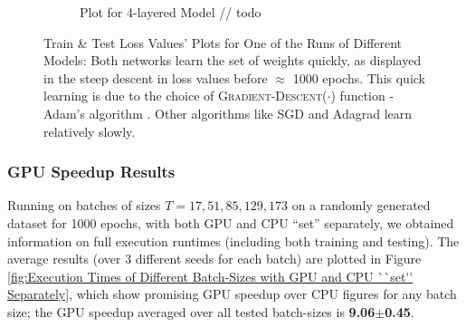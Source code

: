 \documentclass[12pt]{article}
\begin{document}
\begin{figure}[!htbp]
\begin{subfigure}{.49\textwidth}
            \caption{Plot for 4-layered Model // todo}
            \label{fig:Plot for 4-layered Model}
        \end{subfigure}
        \caption[Train \& Test Loss Values' Plots for One of the Runs of Different Models]{Train \& Test Loss Values' Plots for One of the Runs of Different Models: Both networks learn the set of weights quickly, as displayed in the steep descent in loss values before $\approx$ 1000 epochs. This quick learning is due to the choice of \textsc{Gradient-Descent}($\cdot$) function - Adam's algorithm \cite{Adam}. Other algorithms like SGD \cite{SGD} and Adagrad \cite{Adagrad} learn relatively slowly.}
        \label{fig:Train & Test Loss Values' Plots of Different Models}
    \end{figure}

    \subsubsection{GPU Speedup Results} \label{sec:IdProbRes - GPU}
    Running on batches of sizes $T = 17, 51, 85, 129, 173$ on a randomly generated dataset for 1000 epochs, with both GPU and CPU ``set'' separately, we obtained information on full execution runtimes (including both training and testing). The average results (over 3 different seeds for each batch) are plotted in Figure \ref{fig:Execution Times of Different Batch-Sizes with GPU and CPU ``set'' Separately}, which show promising GPU speedup over CPU figures for any batch size; the GPU speedup averaged over all tested batch-sizes is \textbf{9.06$\pm$0.45}.
\end{document}
